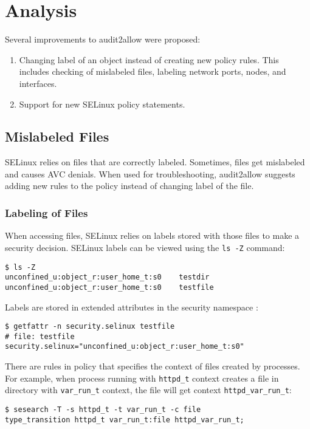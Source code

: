 \chapter{Analysis}
Several improvements to audit2allow were proposed:
\begin{enumerate}
    \item Changing label of an object instead of creating new policy rules. This
        includes checking of mislabeled files, labeling network ports, nodes,
        and interfaces.
    \item Support for new SELinux policy statements.
\end{enumerate}

\section{Mislabeled Files}
SELinux relies on files that are correctly labeled. Sometimes, files get
mislabeled and causes AVC denials. When used for troubleshooting, audit2allow
suggests adding new rules to the policy instead of changing label of the file.

\subsection{Labeling of Files}
When accessing files, SELinux relies on labels stored with those files to make a
security decision. SELinux labels can be viewed using the \texttt{ls -Z}
command:
\begin{lstlisting}
$ ls -Z
unconfined_u:object_r:user_home_t:s0    testdir
unconfined_u:object_r:user_home_t:s0    testfile
\end{lstlisting}
Labels are stored in extended attributes in the security namespace
\cite{xattrman}:
\begin{lstlisting}
$ getfattr -n security.selinux testfile
# file: testfile
security.selinux="unconfined_u:object_r:user_home_t:s0"
\end{lstlisting}

There are rules in policy that specifies the context of files created by
processes. For example, when process running with \texttt{httpd\_t} context
creates a file in directory with \texttt{var\_run\_t} context, the file will get
context \texttt{httpd\_var\_run\_t}:
\begin{lstlisting}
$ sesearch -T -s httpd_t -t var_run_t -c file
type_transition httpd_t var_run_t:file httpd_var_run_t;
\end{lstlisting}

